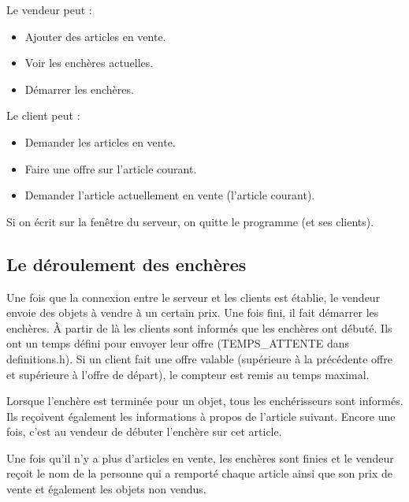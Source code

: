 \clearpage

Le vendeur peut :
\begin{itemize}
\item Ajouter des articles en vente.
\item Voir les enchères actuelles.
\item Démarrer les enchères.
\end{itemize}

Le client peut :
\begin{itemize}
\item Demander les articles en vente.
\item Faire une offre sur l'article courant.
\item Demander l'article actuellement en vente (l'article courant).
\end{itemize}

Si on écrit sur la fenêtre du serveur, on quitte le programme (et ses clients).

\subsection{Le déroulement des enchères}
Une fois que la connexion entre le serveur et les clients est établie, 
le vendeur envoie des objets à vendre à un certain prix.
Une fois fini, il fait démarrer les enchères.
À partir de là les clients sont informés que les enchères ont débuté.
Ils ont un temps défini pour envoyer leur offre (TEMPS\_ATTENTE dans definitions.h).
Si un client fait une offre valable (supérieure à la précédente offre et supérieure à l'offre de départ),
le compteur est remis au temps maximal.

Lorsque l'enchère est terminée pour un objet, tous les enchérisseurs sont informés.
Ils reçoivent également les informations à propos de l'article suivant.
Encore une fois, c'est au vendeur de débuter l'enchère sur cet article.

Une fois qu'il n'y a plus d'articles en vente, les enchères sont finies
et le vendeur reçoit le nom de la personne qui a remporté chaque article ainsi que son prix de vente et
également les objets non vendus.

